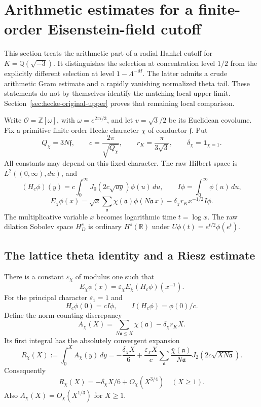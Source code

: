 \section{Arithmetic estimates for a finite-order Eisenstein-field cutoff}
\label{sec:hecke-arithmetic-attempt}

This section treats the arithmetic part of a radial Hankel cutoff for
$K=\mathbb Q(\sqrt{-3})$.  It distinguishes the selection at concentration
level $1/2$ from the explicitly different selection at level
$1-\Lambda^{-M}$.  The latter admits a crude arithmetic Gram estimate
and a rapidly vanishing normalized theta tail.  These statements do not
by themselves identify the matching local upper limit.
Section~\ref{sec:hecke-original-upper} proves that remaining
local comparison.

Write $\mathcal O=\mathbb Z[\omega]$, with $\omega=e^{2\pi i/3}$,
and let $v=\sqrt3/2$ be its Euclidean covolume.  Fix a primitive
finite-order Hecke character $\chi$ of conductor $\mathfrak f$.  Put
\[
 Q_\chi=3N\mathfrak f,\qquad
 c=\frac{2\pi}{\sqrt{Q_\chi}},\qquad
 r_K=\frac{\pi}{3\sqrt3},\qquad
 \delta_\chi=\mathbf1_{\chi=1}.
\]
All constants may depend on this fixed character.  The raw Hilbert
space is $L^2((0,\infty),du)$, and
\[
 (H_c\phi)(y)=c\int_0^\infty J_0(2c\sqrt{uy})\phi(u)\,du,
 \qquad I\phi=\int_0^\infty\phi(u)\,du,
\]
\[
 E_\chi\phi(x)=\sqrt x\sum_{\mathfrak a}
       \chi(\mathfrak a)\phi(N\mathfrak a\,x)
       -\delta_\chi r_K x^{-1/2}I\phi.
\]
The multiplicative variable $x$ becomes logarithmic time $t=\log x$.
The raw dilation Sobolev space $H_D^s$ is ordinary $H^s(\mathbb R)$
under $U\phi(t)=e^{t/2}\phi(e^t)$.

\subsection{The lattice theta identity and a Riesz estimate}

\begin{proposition}
\label{prop:hecke-lattice-poisson}
There is a constant $\varepsilon_\chi$ of modulus one such that
\[
 E_\chi\phi(x)=\varepsilon_\chi
                  E_{\bar\chi}(H_c\phi)(x^{-1}).
\]
For the principal character $\varepsilon_1=1$ and
\[
 H_c\phi(0)=cI\phi,\qquad I(H_c\phi)=\phi(0)/c.
\]
Define the norm-counting discrepancy
\[
 A_\chi(X)=\sum_{N\mathfrak a\leq X}\chi(\mathfrak a)
                          -\delta_\chi r_KX.
\]
Its first integral has the absolutely convergent expansion
\begin{equation}\label{eq:hecke-riesz}
 R_\chi(X):=\int_0^X A_\chi(y)\,dy
 =-\frac{\delta_\chi X}{6}
 +\frac{\varepsilon_\chi X}{c}
   \sum_{\mathfrak a}\frac{\bar\chi(\mathfrak a)}{N\mathfrak a}
                  J_2(2c\sqrt{XN\mathfrak a}).
\end{equation}
Consequently
\[
 R_\chi(X)=-\delta_\chi X/6+O_\chi(X^{3/4})\quad(X\geq1).
\]
Also $A_\chi(X)=O_\chi(X^{1/3})$ for $X\geq1$.
\end{proposition}

